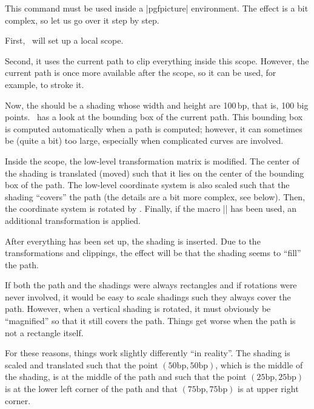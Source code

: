 \begin{command}{\pgfshadepath{}}
    This command must be used inside a |{pgfpicture}| environment. The effect
    is a bit complex, so let us go over it step by step.

    First, \pgfname\ will set up a local scope.

    Second, it uses the current path to clip everything inside this scope.
    However, the current path is once more available after the scope, so it can
    be used, for example, to stroke it.

    Now, the  should be a shading whose width and height are
    100\,bp, that is, 100 big points. \pgfname\ has a look at the bounding box
    of the current path. This bounding box is computed automatically when a
    path is computed; however, it can sometimes be (quite a bit) too large,
    especially when complicated curves are involved.

    Inside the scope, the low-level transformation matrix is modified. The
    center of the shading is translated (moved) such that it lies on the center
    of the bounding box of the path. The low-level coordinate system is also
    scaled such that the shading ``covers'' the path (the details are a bit
    more complex, see below). Then, the coordinate system is rotated by
    . Finally, if the macro |\pgfsetadditionalshadetransform| has
    been used, an additional transformation is applied.

    After everything has been set up, the shading is inserted. Due to the
    transformations and clippings, the effect will be that the shading seems
    to ``fill'' the path.

    If both the path and the shadings were always rectangles and if rotations
    were never involved, it would be easy to scale shadings such they always
    cover the path. However, when a vertical shading is rotated, it must
    obviously be ``magnified'' so that it still covers the path. Things get
    worse when the path is not a rectangle itself.

    For these reasons, things work slightly differently ``in reality''. The
    shading is scaled and translated such that the point
    $(50\mathrm{bp},50\mathrm{bp})$, which is the middle of the shading, is at
    the middle of the path and such that the point
    $(25\mathrm{bp},25\mathrm{bp})$ is at the lower left corner of the path and
    that $(75\mathrm{bp},75\mathrm{bp})$ is at upper right corner.


\end{command}
